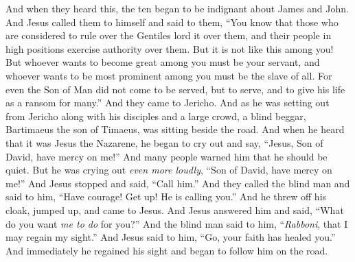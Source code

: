 \begin{biblechapter}
\verse And when they heard this, the ten began to be indignant about James and John.
\verse And Jesus called them to himself and said to them, “You know that those who are considered to rule over the Gentiles lord it over them, and their people in high positions exercise authority over them.
\verse But it is not like this among you! But whoever wants to become great among you must be your servant,
\verse and whoever wants to be most prominent among you must be the slave of all.
\verse For even the Son of Man did not come to be served, but to serve, and to give his life as a ransom for many.”
 And they came to Jericho. And as he was setting out from Jericho along with his disciples and a large crowd, a blind beggar, Bartimaeus the son of Timaeus, was sitting beside the road.
\verse And when he heard that it was Jesus the Nazarene, he began to cry out and say, “Jesus, Son of David, have mercy on me!”
\verse And many people warned him that he should be quiet. But he was crying out \textit{even more loudly}, “Son of David, have mercy on me!”
\verse And Jesus stopped and said, “Call him.” And they called the blind man and said to him, “Have courage! Get up! He is calling you.”
\verse And he threw off his cloak, jumped up, and came to Jesus.
\verse And Jesus answered him and said, “What do you want \textit{me to do} for you?” And the blind man said to him, “\textit{Rabboni}, that I may regain my sight.”
\verse And Jesus said to him, “Go, your faith has healed you.” And immediately he regained his sight and began to follow him on the road.
\end{biblechapter}

